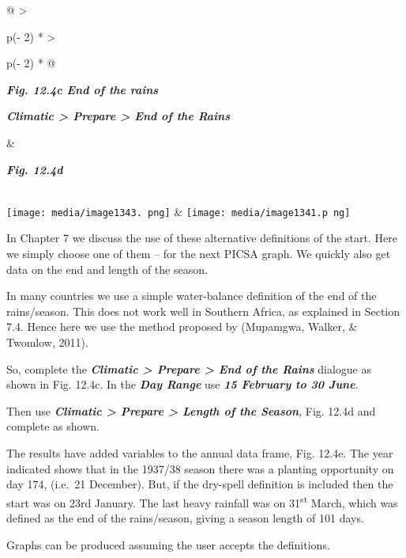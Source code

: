 \documentclass[
  letterpaper,
  DIV=11,
  numbers=noendperiod]{scrreprt}
\begin{document}
\begin{longtable}[]{@{}
  >{\raggedright\arraybackslash}p{(\columnwidth - 2\tabcolsep) * }
  >{\raggedright\arraybackslash}p{(\columnwidth - 2\tabcolsep) * }@{}}
\toprule\noalign{}
\begin{minipage}[b]{\linewidth}\raggedright
\textbf{\emph{Fig. 12.4c End of the rains}}

\textbf{\emph{Climatic \textgreater{} Prepare \textgreater{} End of the
Rains}}
\end{minipage} & \begin{minipage}[b]{\linewidth}\raggedright
\textbf{\emph{Fig. 12.4d}}
\end{minipage} \\
\midrule\noalign{}
\endhead
\bottomrule\noalign{}
\endlastfoot
\texttt{[image: media/image1343. png]}
&
\texttt{[image: media/image1341.p ng]} \\
\end{longtable}

In Chapter 7 we discuss the use of these alternative definitions of the
start. Here we simply choose one of them -- for the next PICSA graph. We
quickly also get data on the end and length of the season.

In many countries we use a simple water-balance definition of the end of
the rains/season. This does not work well in Southern Africa, as
explained in Section 7.4. Hence here we use the method proposed by
(Mupamgwa, Walker, \& Twomlow, 2011).

So, complete the \textbf{\emph{Climatic \textgreater{} Prepare
\textgreater{} End of the Rains}} dialogue as shown in Fig. 12.4c. In
the \textbf{\emph{Day Range}} use \textbf{\emph{15 February to 30
June}}.

Then use \textbf{\emph{Climatic \textgreater{} Prepare \textgreater{}
Length of the Season}}, Fig. 12.4d and complete as shown.

The results have added variables to the annual data frame, Fig. 12.4e.
The year indicated shows that in the 1937/38 season there was a planting
opportunity on day 174, (i.e.~21 December). But, if the dry-spell
definition is included then the start was on 23rd January. The last
heavy rainfall was on 31\textsuperscript{st} March, which was defined as
the end of the rains/season, giving a season length of 101 days.

Graphs can be produced assuming the user accepts the definitions.
\end{document}
